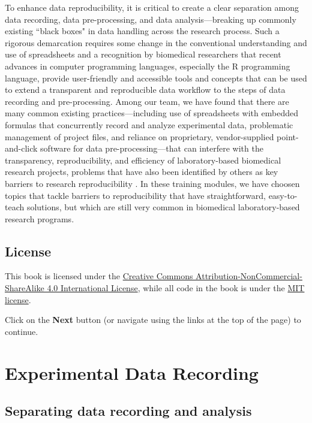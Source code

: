 \documentclass[]{tufte-book}
\begin{document}
To enhance data reproducibility, it is critical to create a clear separation
among data recording, data pre-processing, and data analysis---breaking up
commonly existing ``black boxes" in data handling across the research process.
Such a rigorous demarcation requires some change in the conventional
understanding and use of spreadsheets and a recognition by biomedical
researchers that recent advances in computer programming languages, especially
the R programming language, provide user-friendly and accessible tools and
concepts that can be used to extend a transparent and reproducible data workflow
to the steps of data recording and pre-processing. Among our team, we have found
that there are many common existing practices---including use of spreadsheets
with embedded formulas that concurrently record and analyze experimental data,
problematic management of project files, and reliance on proprietary,
vendor-supplied point-and-click software for data pre-processing---that can
interfere with the transparency, reproducibility, and efficiency of
laboratory-based biomedical research projects, problems that have also been
identified by others as key barriers to research reproducibility
\citep{broman2018data, bryan2018excuse, ellis2018share, marwick2018packaging}. In
these training modules, we have choosen topics that tackle barriers to
reproducibility that have straightforward, easy-to-teach solutions, but which
are still very common in biomedical laboratory-based research programs.

\hypertarget{license}{%
\section{License}\label{license}}

This book is licensed under the \href{https://creativecommons.org/licenses/by-nc-sa/4.0/}{Creative Commons
Attribution-NonCommercial-ShareAlike 4.0 International
License}, while all code in
the book is under the \href{https://opensource.org/licenses/MIT}{MIT license}.

Click on the \textbf{Next} button (or navigate using the
links at the top of the page) to continue.

\hypertarget{experimental-data-recording}{%
\chapter{Experimental Data Recording}\label{experimental-data-recording}}

\hypertarget{separating-data-recording-and-analysis}{%
\section{Separating data recording and analysis}\label{separating-data-recording-and-analysis}}
\end{document}
